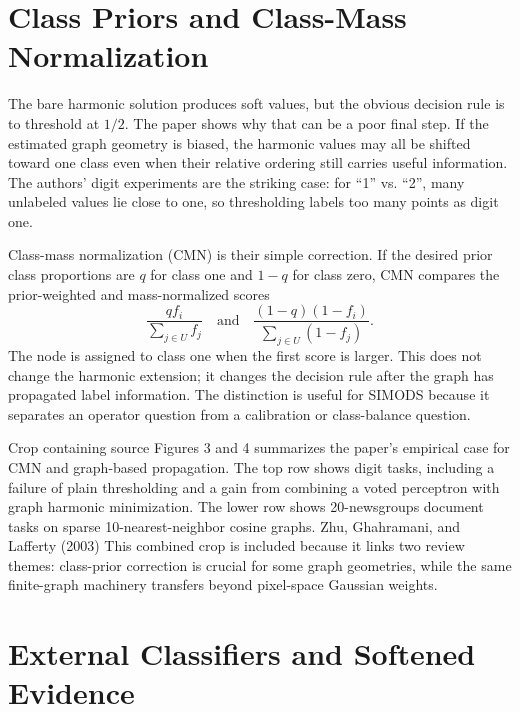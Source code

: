 \documentclass[11pt]{article}
\begin{document}
\section{Class Priors and Class-Mass Normalization}

The bare harmonic solution produces soft values, but the obvious decision rule
is to threshold at \(1/2\). The paper shows why that can be a poor final step.
If the estimated graph geometry is biased, the harmonic values may all be
shifted toward one class even when their relative ordering still carries useful
information. The authors' digit experiments are the striking case: for ``1'' vs.
``2'', many unlabeled values lie close to one, so thresholding labels too many
points as digit one.

Class-mass normalization (CMN) is their simple correction. If the desired prior
class proportions are \(q\) for class one and \(1-q\) for class zero, CMN compares
the prior-weighted and mass-normalized scores
\[
  \frac{q f_i}{\sum_{j\in U}f_j}
  \quad \text{and} \quad
  \frac{(1-q)(1-f_i)}{\sum_{j\in U}(1-f_j)}.
\]
The node is assigned to class one when the first score is larger. This does not
change the harmonic extension; it changes the decision rule after the graph has
propagated label information. The distinction is useful for SIMODS because it
separates an operator question from a calibration or class-balance question.

{Crop containing source Figures 3 and 4 summarizes the paper's
empirical case for CMN and graph-based propagation. The top row shows digit
tasks, including a failure of plain thresholding and a gain from combining a
voted perceptron with graph harmonic minimization. The lower row shows
20-newsgroups document tasks on sparse 10-nearest-neighbor cosine graphs.}
{Zhu, Ghahramani, and Lafferty (2003)}
{This combined crop is included because it links two review themes:
class-prior correction is crucial for some graph geometries, while the same
finite-graph machinery transfers beyond pixel-space Gaussian weights.}

\FloatBarrier

\section{External Classifiers and Softened Evidence}
\end{document}
